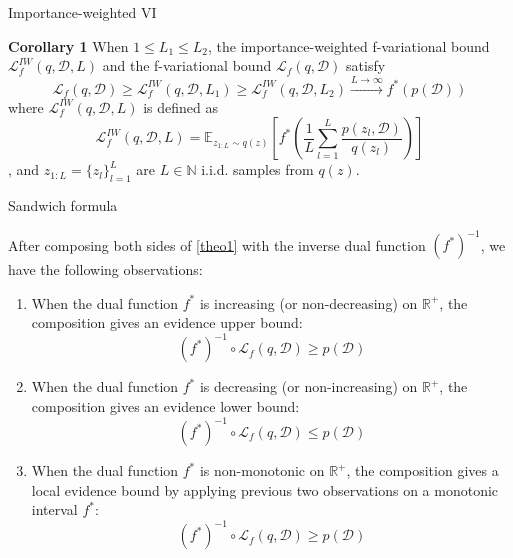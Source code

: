 \documentclass{beamer}
\begin{document}
\begin{frame}{Importance-weighted VI}
    \begin{block}{}
        \textbf{Corollary 1} When $1 \leqslant L_1 \leqslant L_2$, the importance-weighted f-variational bound $\mathcal{L}_f^{IW}(q, \mathcal{D}, L)$ and the f-variational bound $\mathcal{L}_f(q, \mathcal{D})$ satisfy
        $$\mathcal{L}_f(q, \mathcal{D}) \geqslant \mathcal{L}_f^{IW}(q, \mathcal{D}, L_1) \geqslant \mathcal{L}_f^{IW}(q, \mathcal{D}, L_2) \overset{L\to\infty}{\longrightarrow} f^*(p(\mathcal{D}))$$
        where $\mathcal{L}_f^{IW}(q, \mathcal{D}, L)$ is defined as
        $$\mathcal{L}_f^{IW}(q, \mathcal{D}, L) = \mathbb{E}_{z_{1:L}\sim q(z)}\left[f^*\left(\dfrac{1}{L}\sum_{l=1}^L\dfrac{p(z_l, \mathcal{D})}{q(z_l)}\right)\right]$$,
        and $z_{1:L} = \{z_l\}_{l=1}^L$ are $L \in \mathbb{N}$  i.i.d. samples from $q(z)$.
    \end{block}
\end{frame}

\begin{frame}{Sandwich formula}
    \begin{block}{}
        After composing both sides of \eqref{theo1} with the inverse dual function $(f^*)^{-1}$, we have the following observations:
        \begin{enumerate}
            \item When the dual function $f^*$ is increasing (or non-decreasing) on $\mathbb{R}^+$, the composition gives an evidence upper bound:
            $$(f^*)^{-1} \circ \mathcal{L}_f(q, \mathcal{D}) \geqslant p(\mathcal{D})$$
            \item When the dual function $f^*$ is decreasing (or non-increasing) on $\mathbb{R}^+$, the composition gives an evidence lower bound:
            $$(f^*)^{-1} \circ \mathcal{L}_f(q, \mathcal{D}) \leqslant p(\mathcal{D})$$
            \item When the dual function $f^*$ is non-monotonic on $\mathbb{R}^+$, the composition gives a local evidence bound by applying previous two observations on a monotonic interval $f^*$:
            $$(f^*)^{-1} \circ \mathcal{L}_f(q, \mathcal{D}) \geqslant p(\mathcal{D})$$
        \end{enumerate}
    \end{block}
\end{frame}
\end{document}
